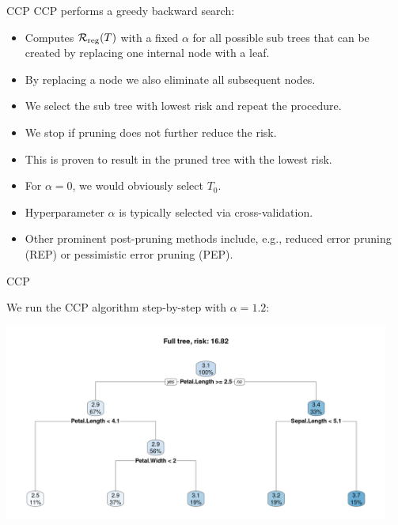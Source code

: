 \documentclass[11pt,compress,t,notes=noshow, xcolor=table]{beamer}
\begin{document}
\begin{vbframe}{CCP}
CCP performs a greedy backward search:
\begin{itemize}
\item Computes $\mathcal{R}_{\text{reg}}(T)$ with a fixed $\alpha$ for all possible sub trees that can be created by replacing one internal node with a leaf.
\item By replacing a node we also eliminate all subsequent nodes.
\item We select the sub tree with lowest risk and repeat the procedure.
\item We stop if pruning does not further reduce the risk.
\end{itemize}
\begin{itemize}
\item This is proven to result in the pruned tree with the lowest risk.
\item For $\alpha = 0$, we would obviously select $T_0$.
\item Hyperparameter $\alpha$ is typically selected via cross-validation.
\item Other prominent post-pruning methods include, e.g., reduced error pruning (REP) or pessimistic error pruning (PEP).
\end{itemize}
\end{vbframe}


\begin{frame}{CCP}

We run the CCP algorithm step-by-step with $\alpha = 1.2$:
\vspace{0.25cm}

\color{fgcolor}

{\centering \includegraphics[width=0.95\textwidth]{figure/ccp_1.pdf} 

}

\end{frame}
\end{document}

